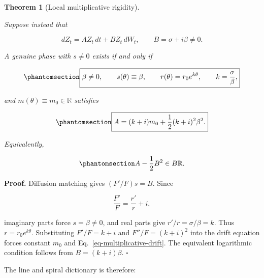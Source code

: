 \documentclass[
  english,
  10pt,
  letterpaper,
  DIV=11,
  numbers=noendperiod]{scrartcl}
\theoremstyle{definition}
\theoremstyle{plain}
\newtheorem{theorem}{Theorem}[section]
\theoremstyle{plain}
\theoremstyle{remark}
\begin{document}
\begin{theorem}[Local multiplicative
rigidity]\protect\hypertarget{thm-multiplicative-rigidity}{}\label{thm-multiplicative-rigidity}

Suppose instead that

\[
dZ_t=A Z_t\,dt+B Z_t\,dW_t,\qquad B=\sigma+i\beta\ne0.
\]

A genuine phase with \(s\ne0\) exists if and only if

\begin{equation}\protect\phantomsection\label{eq-multiplicative-shape}{
\boxed{
\beta\ne0,\qquad
s(\theta)\equiv\beta,\qquad
r(\theta)=r_0e^{k\theta},\qquad
k=\frac{\sigma}{\beta},
}
}\end{equation}

and \(m(\theta)\equiv m_0\in\mathbb R\) satisfies

\begin{equation}\protect\phantomsection\label{eq-multiplicative-drift}{
\boxed{
A=(k+i)m_0+\frac12(k+i)^2\beta^2.
}
}\end{equation}

Equivalently,

\begin{equation}\protect\phantomsection\label{eq-log-collinearity}{
A-\frac12B^2\in B\mathbb R.
}\end{equation}

\end{theorem}

\textbf{Proof.} Diffusion matching gives \((F'/F)s=B\). Since

\[
\frac{F'}F=\frac{r'}r+i,
\]

imaginary parts force \(s=\beta\ne0\), and real parts give
\(r'/r=\sigma/\beta=k\). Thus \(r=r_0e^{k\theta}\). Substituting
\(F'/F=k+i\) and \(F''/F=(k+i)^2\) into the drift equation forces
constant \(m_0\) and Eq.~\ref{eq-multiplicative-drift}. The equivalent
logarithmic condition follows from \(B=(k+i)\beta\). \(\square\)

The line and spiral dictionary is therefore:
\end{document}
